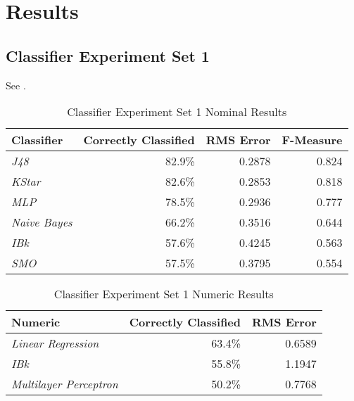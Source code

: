 \documentclass[../thesis/thesis.tex]{subfiles}
\begin{document}
 \chapter{Results}

 \section{Classifier Experiment Set 1}
 See .

\begin{table}
\centering
\begin{tabular}{|l|r|r|r|}
\hline
\textbf{Classifier}  & \textbf{Correctly Classified} & \textbf{RMS Error} & \textbf{F-Measure} \\ \hline
\textit{J48}         & 82.9\%                        & 0.2878             & 0.824              \\ \hline
\textit{KStar}       & 82.6\%                        & 0.2853             & 0.818              \\ \hline
\textit{MLP}         & 78.5\%                        & 0.2936             & 0.777              \\ \hline
\textit{Naive Bayes} & 66.2\%                        & 0.3516             & 0.644              \\ \hline
\textit{IBk}         & 57.6\%                        & 0.4245             & 0.563              \\ \hline
\textit{SMO}         & 57.5\%                        & 0.3795             & 0.554              \\ \hline
\end{tabular}
\caption{Classifier Experiment Set 1 Nominal Results}
\end{table}

\begin{table}
\centering
\begin{tabular}{|l|r|r|}
\hline
\textbf{Numeric}               & \textbf{Correctly Classified} & \textbf{RMS Error} \\ \hline
\textit{Linear Regression}     & 63.4\%                        & 0.6589             \\ \hline
\textit{IBk}                   & 55.8\%                        & 1.1947             \\ \hline
\textit{Multilayer Perceptron} & 50.2\%                        & 0.7768             \\ \hline
\end{tabular}
\caption{Classifier Experiment Set 1 Numeric Results}
\end{table}

\end{document}
